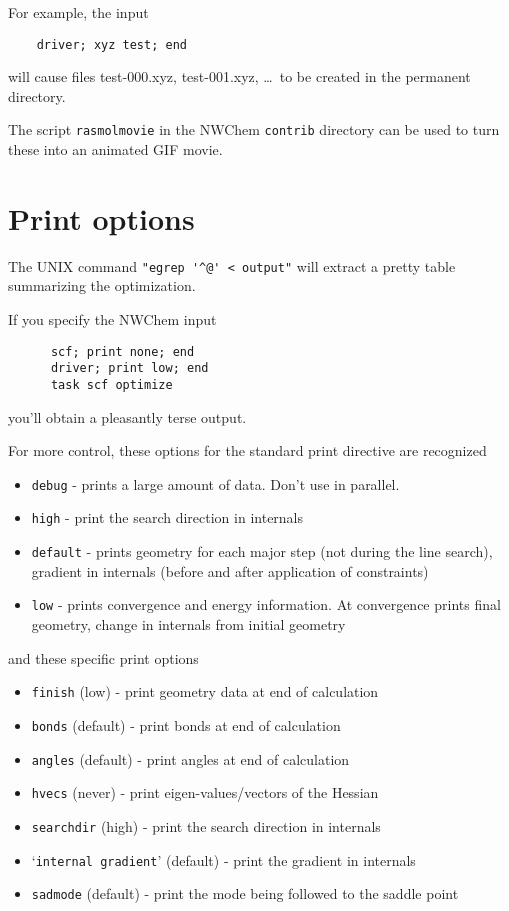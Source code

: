 For example, the input
\begin{verbatim}
    driver; xyz test; end
\end{verbatim}
will cause files test-000.xyz, test-001.xyz, \ldots\ to be created
in the permanent directory.  

The script \verb+rasmolmovie+ in the NWChem \verb+contrib+ directory
can be used to turn these into an animated GIF movie.

\section{Print options}

The UNIX command \verb+"egrep '^@' < output"+ will extract a pretty
table summarizing the optimization.

If you specify the NWChem input
\begin{verbatim}
      scf; print none; end
      driver; print low; end
      task scf optimize
\end{verbatim}
you'll obtain a pleasantly terse output.

For more control, these options for the standard print directive are
recognized
\begin{itemize}
\item \verb+debug+   - prints a large amount of data.  Don't use in parallel.
\item \verb+high+    - print the search direction in internals
\item \verb+default+ - prints geometry for each major step (not during
                the line search), gradient in internals (before
                and after application of constraints)
\item \verb+low+     - prints convergence and energy information.  At 
                convergence prints final geometry, change in internals
                from initial geometry
\end{itemize}
and these specific print options
\begin{itemize}
\item      {\tt finish} (low)      - print geometry data at end of calculation
\item      {\tt bonds}  (default)  - print bonds at end of calculation
\item      {\tt angles} (default)  - print angles at end of calculation
\item      {\tt hvecs}  (never)    - print eigen-values/vectors of the Hessian
\item      {\tt searchdir} (high)  - print the search direction in internals
\item      `{\tt internal gradient}' (default) - print the gradient in internals
\item      {\tt sadmode} (default) - print the mode being followed to the saddle point
\end{itemize}

\fussy


